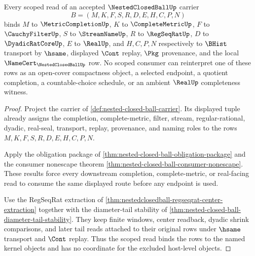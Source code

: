 \begin{theorem}
\label{thm:nested-closed-ball-kernel-scope-binding}
Every scoped read of an accepted $\NestedClosedBallUp$ carrier
$$
B=(M,K,F,S,R,D,E,H,C,P,N)
$$
binds $M$ to $\MetricCompletionUp$, $K$ to $\CompleteMetricUp$, $F$ to $\CauchyFilterUp$, $S$ to $\StreamNameUp$, $R$ to $\RegSeqRatUp$, $D$ to $\DyadicRatCoreUp$, $E$ to $\RealUp$, and $H,C,P,N$ respectively to $\BHist$ transport by $\hsame$, displayed $\Cont$ replay, $\Pkg$ provenance, and the local $\NameCert_{\NestedClosedBallUp}$ row. No scoped consumer can reinterpret one of these rows as an open-cover compactness object, a selected endpoint, a quotient completion, a countable-choice schedule, or an ambient $\RealUp$ completeness witness.
\end{theorem}
\begin{proof}
Project the carrier of \autoref{def:nested-closed-ball-carrier}. Its displayed tuple already assigns the completion, complete-metric, filter, stream, regular-rational, dyadic, real-seal, transport, replay, provenance, and naming roles to the rows $M,K,F,S,R,D,E,H,C,P,N$.

Apply the obligation package of \autoref{thm:nested-closed-ball-obligation-package} and the consumer nonescape theorem \autoref{thm:nested-closed-ball-consumer-nonescape}. These results force every downstream completion, complete-metric, or real-facing read to consume the same displayed route before any endpoint is used.

Use the RegSeqRat extraction of \autoref{thm:nestedclosedball-regseqrat-center-extraction} together with the diameter-tail stability of \autoref{thm:nested-closed-ball-diameter-tail-stability}. They keep finite windows, center readback, dyadic shrink comparisons, and later tail reads attached to their original rows under $\hsame$ transport and $\Cont$ replay. Thus the scoped read binds the rows to the named kernel objects and has no coordinate for the excluded host-level objects.
\end{proof}

